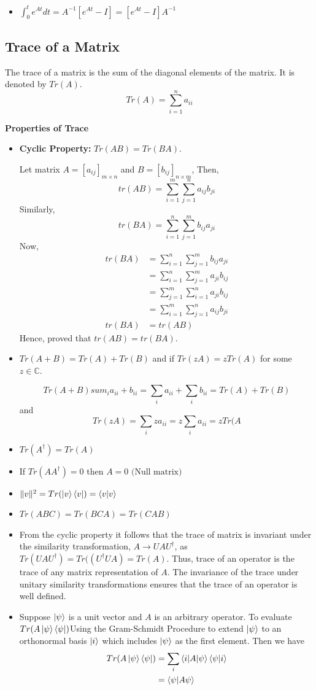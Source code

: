 \begin{itemize}
    \item $\int_0^t e^{At}dt=A^{-1}[e^{At}-I]=[e^{At}-I]A^{-1}$
\end{itemize}

\subsection{Trace of a Matrix}
\begin{definition} 
    The trace of a matrix is the sum of the diagonal elements of the matrix. It is denoted by $Tr(A)$.
    \[ Tr(A)=\sum_{i=1}^n a_{ii} \]
\end{definition}
\textbf{Properties of Trace}
\begin{itemize}
    \item \textbf{Cyclic Property: }$Tr(AB)=Tr(BA)$.
    
    Let matrix $A=[a_{ij}]_{m \times n}$ and $B=[b_{ij}]_{n \times m}$, Then,
    \[
    tr(AB)=\sum_{i=1}^m \sum_{j=1}^n a_{ij}b_{ji}
    \]
    Similarly,
    \[
    tr(BA)=\sum_{i=1}^n \sum_{j=1}^m b_{ij}a_{ji}
    \]
    Now,
    \begin{align*}
    tr(BA)&=\sum_{i=1}^n \sum_{j=1}^m b_{ij}a_{ji}\\
    &=\sum_{i=1}^n \sum_{j=1}^m a_{ji}b_{ij} \\
    &=\sum_{j=1}^m \sum_{i=1}^n a_{ji}b_{ij} \\
    &=\sum_{i=1}^m \sum_{j=1}^n a_{ij}b_{ji} \\
    tr(BA)&=tr(AB)
    \end{align*}
    Hence, proved that $tr(AB)=tr(BA)$.
    \item $Tr(A+B)=Tr(A)+Tr(B)$ and if $Tr(zA)=zTr(A)$ for some $z \in \mathbb{C}$.

    \[
    Tr(A+B)sum_i a_{ii}+b_{ii}=\sum_i a_{ii} + \sum_i b_{ii}=Tr(A)+Tr(B)
    \]
    and
    \[
    Tr(zA)=\sum_i za_{ii}=z\sum_i a_{ii}=zTr(A
    \]
    \item $Tr(A^{\dagger})=Tr(A)$
    \item If $Tr(AA^{\dagger})=0$ then $A=0 \text{ (Null matrix)}$
    \item $\|v\|^2=Tr(\ket{v}\bra{v})=\braket{v|v}$
    \item $Tr(ABC)=Tr(BCA)=Tr(CAB)$
    \item From the cyclic property it follows that the trace of matrix is invariant under the similarity transformation,
    $A \rightarrow UAU^{\dagger}$, as $Tr(UAU^{\dagger})=Tr((U^{\dagger}UA)=Tr(A)$. Thus, trace of an operator is the trace of any matrix representation of $A$. The invariance of the trace under unitary similarity transformations ensures that the trace of an operator is well defined.
    \item Suppose $\ket{\psi}$ is a unit vector and $A$ is an arbitrary operator. To evaluate $Tr(A\ket{\psi}\bra{\psi})$Using the Gram-Schmidt Procedure to extend $\ket{\psi}$ to an orthonormal basis $\ket{i}$ which includes $\ket{\psi}$ as the first element. Then we have
    \begin{align*}
    Tr(A\ket{\psi}\bra{\psi})&=\sum_i \braket{i|A|\psi}\braket{\psi|i}\\
    &=\braket{\psi|A\psi}
    \end{align*}
\end{itemize}

